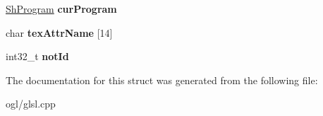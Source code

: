 \begin{DoxyCompactItemize}
\item 
\hypertarget{struct_g_l_s_l_1_1_data_a36b54e6f5801f6dd1c519cd0af8e6476}{\hyperlink{struct_g_l_s_l_1_1_data_1_1_sh_program}{Sh\+Program} {\bfseries cur\+Program}}\label{struct_g_l_s_l_1_1_data_a36b54e6f5801f6dd1c519cd0af8e6476}

\item 
\hypertarget{struct_g_l_s_l_1_1_data_a3c761e20f70f0990df17b4e30cd19db6}{char {\bfseries tex\+Attr\+Name} \mbox{[}14\mbox{]}}\label{struct_g_l_s_l_1_1_data_a3c761e20f70f0990df17b4e30cd19db6}

\item 
\hypertarget{struct_g_l_s_l_1_1_data_af6813ecdd7bc0027d76f9b173da815f5}{int32\+\_\+t {\bfseries not\+Id}}\label{struct_g_l_s_l_1_1_data_af6813ecdd7bc0027d76f9b173da815f5}

\end{DoxyCompactItemize}


The documentation for this struct was generated from the following file\+:\begin{DoxyCompactItemize}
\item 
ogl/glsl.\+cpp\end{DoxyCompactItemize}
